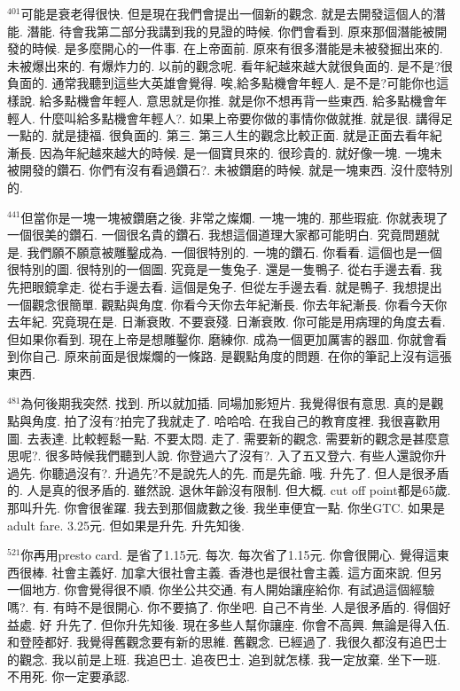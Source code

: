\documentclass{book}
\begin{document}
$^{401}$可能是衰老得很快.
但是現在我們會提出一個新的觀念.
就是去開發這個人的潛能.
潛能.
待會我第二部分我講到我的見證的時候.
你們會看到.
原來那個潛能被開發的時候.
是多麼開心的一件事.
在上帝面前.
原來有很多潛能是未被發掘出來的.
未被爆出來的.
有爆炸力的.
以前的觀念呢.
看年紀越來越大就很負面的.
是不是?很負面的.
通常我聽到這些大英雄會覺得.
唉,給多點機會年輕人.
是不是?可能你也這樣說.
給多點機會年輕人.
意思就是你推.
就是你不想再背一些東西.
給多點機會年輕人.
什麼叫給多點機會年輕人?.
如果上帝要你做的事情你做就推.
就是很.
講得足一點的.
就是捷福.
很負面的.
第三.
第三人生的觀念比較正面.
就是正面去看年紀漸長.
因為年紀越來越大的時候.
是一個寶貝來的.
很珍貴的.
就好像一塊.
一塊未被開發的鑽石.
你們有沒有看過鑽石?.
未被鑽磨的時候.
就是一塊東西.
沒什麼特別的.

$^{441}$但當你是一塊一塊被鑽磨之後.
非常之燦爛.
一塊一塊的.
那些瑕疵.
你就表現了一個很美的鑽石.
一個很名貴的鑽石.
我想這個道理大家都可能明白.
究竟問題就是.
我們願不願意被雕鑿成為.
一個很特別的.
一塊的鑽石.
你看看.
這個也是一個很特別的圖.
很特別的一個圖.
究竟是一隻兔子.
還是一隻鴨子.
從右手邊去看.
我先把眼鏡拿走.
從右手邊去看.
這個是兔子.
但從左手邊去看.
就是鴨子.
我想提出一個觀念很簡單.
觀點與角度.
你看今天你去年紀漸長.
你去年紀漸長.
你看今天你去年紀.
究竟現在是.
日漸衰敗.
不要衰殘.
日漸衰敗.
你可能是用病理的角度去看.
但如果你看到.
現在上帝是想雕鑿你.
磨練你.
成為一個更加厲害的器皿.
你就會看到你自己.
原來前面是很燦爛的一條路.
是觀點角度的問題.
在你的筆記上沒有這張東西.

$^{481}$為何後期我突然.
找到.
所以就加插.
同場加影短片.
我覺得很有意思.
真的是觀點與角度.
拍了沒有?拍完了我就走了.
哈哈哈.
在我自己的教育度裡.
我很喜歡用圖.
去表達.
比較輕鬆一點.
不要太悶.
走了.
需要新的觀念.
需要新的觀念是甚麼意思呢?.
很多時候我們聽到人說.
你登過六了沒有?.
入了五又登六.
有些人還說你升過先.
你聽過沒有?.
升過先?不是說先人的先.
而是先爺.
哦.
升先了.
但人是很矛盾的.
人是真的很矛盾的.
雖然說.
退休年齡沒有限制.
但大概.
cut off point都是65歲.
那叫升先.
你會很雀躍.
我去到那個歲數之後.
我坐車便宜一點.
你坐GTC.
如果是adult fare.
3.25元.
但如果是升先.
升先知後.

$^{521}$你再用presto card.
是省了1.15元.
每次.
每次省了1.15元.
你會很開心.
覺得這東西很棒.
社會主義好.
加拿大很社會主義.
香港也是很社會主義.
這方面來說.
但另一個地方.
你會覺得很不順.
你坐公共交通.
有人開始讓座給你.
有試過這個經驗嗎?.
有.
有時不是很開心.
你不要搞了.
你坐吧.
自己不肯坐.
人是很矛盾的.
得個好益處.
好 升先了.
但你升先知後.
現在多些人幫你讓座.
你會不高興.
無論是得入伍.
和登陸都好.
我覺得舊觀念要有新的思維.
舊觀念.
已經過了.
我很久都沒有追巴士的觀念.
我以前是上班.
我追巴士.
追夜巴士.
追到就怎樣.
我一定放棄.
坐下一班.
不用死.
你一定要承認.
\end{document}
